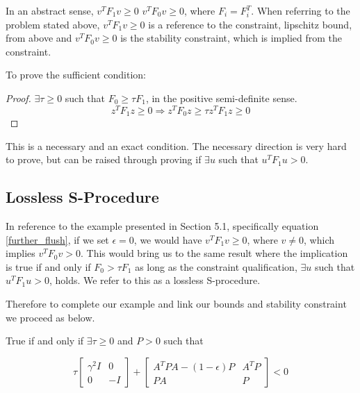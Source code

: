 \documentclass{article}[12pt]
\def\eps{\epsilon}
\begin{document}
\noindent In an abstract sense, $v^T F_1 v \geq 0 $ \Rightarrow $v^T F_0 v \geq 0$, where $F_i = F_i^T$. When referring to the problem stated above, $v^T F_1 v \geq 0 $ is a reference to the constraint, lipschitz bound, from above and $v^T F_0 v \geq 0$ is the stability constraint, which is implied from the constraint.

\noindent To prove the sufficient condition:  


\begin{proof}
$\exists \tau \geq 0$ such that $F_0 \geq \tau F_1$, in the positive semi-definite sense.
\begin{equation}
    z^T F_1 z \geq 0 \Rightarrow z^T F_0 z \geq \tau z^T F_1 z \geq 0
\end{equation}
\end{proof}

\noindent This is a necessary and an exact condition. The necessary direction is very hard to prove, but can be raised through proving if $\exists u $ such that $u^T F_1 u > 0$.

\subsection{Lossless S-Procedure}
In reference to the example presented in Section 5.1, specifically equation \ref{further_flush}, if we set $\eps = 0$, we would have $v^T F_1 v \geq 0 $, where $v \neq 0$, which implies $v^T F_0 v > 0$. This would bring us to the same result where the implication is true if and only if $F_0 > \tau F_1$ as long as the constraint qualification, $\exists u $ such that $u^T F_1 u > 0$, holds. We refer to this as a lossless S-procedure. 

\noindent Therefore to complete our example and link our bounds and stability constraint we proceed as below.

True if and only if $\exists \tau \geq 0$ and $P>0$ such that

\begin{equation}
    \tau
    \begin{bmatrix}
        \gamma^2 I & 0 \\
         0 &-I
    \end{bmatrix} +
    \begin{bmatrix}
        A^{T}PA - (1-\eps)P & A^T P \\
         PA &P
    \end{bmatrix}  <
    0
\end{equation}
\end{document}
